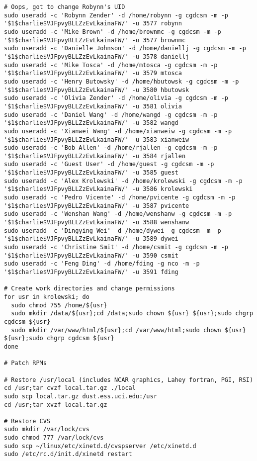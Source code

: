 \documentclass[12pt,twoside]{article}
\begin{document}
\begin{verbatim}
# Oops, got to change Robynn's UID
sudo useradd -c 'Robynn Zender' -d /home/robynn -g cgdcsm -m -p '$1$charlie$VJFpvyBLLZzEvLkainaFW/' -u 3577 robynn
sudo useradd -c 'Mike Brown' -d /home/brownmc -g cgdcsm -m -p '$1$charlie$VJFpvyBLLZzEvLkainaFW/' -u 3577 brownmc
sudo useradd -c 'Danielle Johnson' -d /home/daniellj -g cgdcsm -m -p '$1$charlie$VJFpvyBLLZzEvLkainaFW/' -u 3578 daniellj
sudo useradd -c 'Mike Tosca' -d /home/mtosca -g cgdcsm -m -p '$1$charlie$VJFpvyBLLZzEvLkainaFW/' -u 3579 mtosca
sudo useradd -c 'Henry Butowsky' -d /home/hbutowsk -g cgdcsm -m -p '$1$charlie$VJFpvyBLLZzEvLkainaFW/' -u 3580 hbutowsk
sudo useradd -c 'Olivia Zender' -d /home/olivia -g cgdcsm -m -p '$1$charlie$VJFpvyBLLZzEvLkainaFW/' -u 3581 olivia
sudo useradd -c 'Daniel Wang' -d /home/wangd -g cgdcsm -m -p '$1$charlie$VJFpvyBLLZzEvLkainaFW/' -u 3582 wangd
sudo useradd -c 'Xianwei Wang' -d /home/xianweiw -g cgdcsm -m -p '$1$charlie$VJFpvyBLLZzEvLkainaFW/' -u 3583 xianweiw
sudo useradd -c 'Bob Allen' -d /home/rjallen -g cgdcsm -m -p '$1$charlie$VJFpvyBLLZzEvLkainaFW/' -u 3584 rjallen
sudo useradd -c 'Guest User' -d /home/guest -g cgdcsm -m -p '$1$charlie$VJFpvyBLLZzEvLkainaFW/' -u 3585 guest
sudo useradd -c 'Alex Krolewski' -d /home/krolewski -g cgdcsm -m -p '$1$charlie$VJFpvyBLLZzEvLkainaFW/' -u 3586 krolewski
sudo useradd -c 'Pedro Vicente' -d /home/pvicente -g cgdcsm -m -p '$1$charlie$VJFpvyBLLZzEvLkainaFW/' -u 3587 pvicente
sudo useradd -c 'Wenshan Wang' -d /home/wenshanw -g cgdcsm -m -p '$1$charlie$VJFpvyBLLZzEvLkainaFW/' -u 3588 wenshanw
sudo useradd -c 'Dingying Wei' -d /home/dywei -g cgdcsm -m -p '$1$charlie$VJFpvyBLLZzEvLkainaFW/' -u 3589 dywei
sudo useradd -c 'Christine Smit' -d /home/csmit -g cgdcsm -m -p '$1$charlie$VJFpvyBLLZzEvLkainaFW/' -u 3590 csmit
sudo useradd -c 'Feng Ding' -d /home/fding -g nco -m -p '$1$charlie$VJFpvyBLLZzEvLkainaFW/' -u 3591 fding

# Create work directories and change permissions 
for usr in krolewski; do
  sudo chmod 755 /home/${usr}
  sudo mkdir /data/${usr};cd /data;sudo chown ${usr} ${usr};sudo chgrp cgdcsm ${usr}
  sudo mkdir /var/www/html/${usr};cd /var/www/html;sudo chown ${usr} ${usr};sudo chgrp cgdcsm ${usr}
done

# Patch RPMs

# Restore /usr/local (includes NCAR graphics, Lahey fortran, PGI, RSI)
cd /usr;tar cvzf local.tar.gz ./local
sudo scp local.tar.gz dust.ess.uci.edu:/usr
cd /usr;tar xvzf local.tar.gz

# Restore CVS
sudo mkdir /var/lock/cvs
sudo chmod 777 /var/lock/cvs
sudo scp ~/linux/etc/xinetd.d/cvspserver /etc/xinetd.d
sudo /etc/rc.d/init.d/xinetd restart


\end{verbatim}
\end{document}
